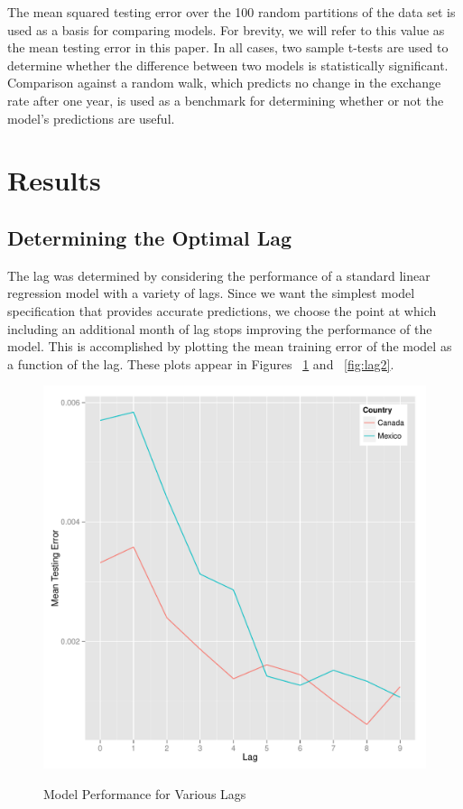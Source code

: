 \documentclass{sig-alternate-05-2015}
\begin{document}
\par{} The mean squared testing error over the 100 random partitions of the data set is used as a basis for comparing models. For brevity, we will refer to this value as the mean testing error in this paper. In all cases, two sample t-tests are used to determine whether the difference between two models is statistically significant. Comparison against a random walk, which predicts no change in the exchange rate after one year, is used as a benchmark for determining whether or not the model's predictions are useful.

\section{Results}

\subsection{Determining the Optimal Lag}
The lag was determined by considering the performance of a standard linear regression model with a variety of lags. Since we want the simplest model specification that provides accurate predictions, we choose the point at which including an additional month of lag stops improving the performance of the model. This is accomplished by plotting the mean training error of the model as a function of the lag. These plots appear in Figures ~\ref{fig:lag1} and ~\ref{fig:lag2}. 

\begin{figure}
\centering
\caption{Model Performance for Various Lags}
\includegraphics[scale=0.45]{lag1.pdf}
\label{fig:lag1}
\end{figure}
\end{document}
